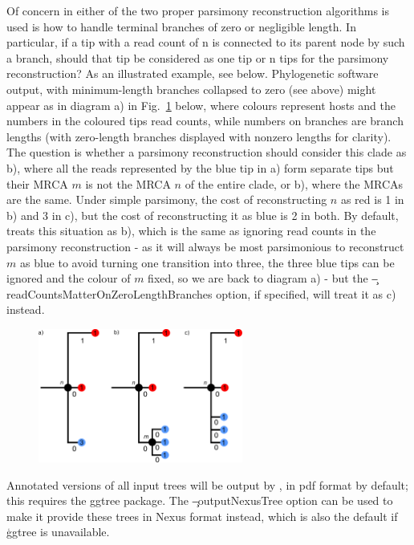 Of concern in either of the two proper parsimony reconstruction algorithms is used is how to handle terminal branches of zero or negligible length.
In particular, if a tip with a read count of n is connected to its parent node by such a branch, should that tip be considered as one tip or n tips for the parsimony reconstruction? As an illustrated example, see below.
Phylogenetic software output, with minimum-length branches collapsed to zero (see above) might appear as in diagram a) in Fig.~\ref{fig:ZeroLengthBranches} below, where colours represent hosts and the numbers in the coloured tips read counts, while numbers on branches are branch lengths (with zero-length branches displayed with nonzero lengths for clarity).
The question is whether a parsimony reconstruction should consider this clade as b), where all the reads represented by the blue tip in a) form separate tips but their MRCA $m$ is not the MRCA $n$ of the entire clade, or b), where the MRCAs are the same.
Under simple parsimony, the cost of reconstructing $n$ as red is 1 in b) and 3 in c), but the cost of reconstructing it as blue is 2 in both.
By default, \pat treats this situation as b), which is the same as ignoring read counts in the parsimony reconstruction - as it will always be most parsimonious to reconstruct $m$ as blue to avoid turning one transition into three, the three blue tips can be ignored and the colour of $m$ fixed, so we are back to diagram a) - but the \c{--readCountsMatterOnZeroLengthBranches} option, if specified, will treat it as c) instead.

\begin{figure}[!h]
\centering
\includegraphics[width=0.6\textwidth]{manualfigure.pdf}
\label{fig:ZeroLengthBranches}
\end{figure}

Annotated versions of all input trees will be output by \pat, in pdf format by default; this requires the ggtree package.
The \c{--outputNexusTree} option can be used to make it provide these trees in Nexus format instead, which is also the default if \c{ggtree} is unavailable.


